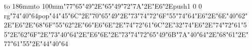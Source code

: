 \hbox to 186mm{\hsize=81mm\vbox to 100mm{\vfill\ipa\char"77\ipa\char"65\ipa\char"49\ipa\char"2E\ipa\char"65\ipa\char"49\ipa\char"72\ipa\char"7A\ipa\char"2E\ipa\char"E6\ipa\char"2E\pdfcolorstack\match push{1 0 0 rg}\ipa\char"74\ipa\char"40\ipa\char"64\pdfcolorstack\match pop{}\medskip\ipa\char"44\ipa\char"45\ipa\char"6C\ipa\char"2E\ipa\char"70\ipa\char"65\ipa\char"49\ipa\char"2E\ipa\char"73\ipa\char"74\ipa\char"72\ipa\char"6F\ipa\char"55\ipa\char"74\medskip\ipa\char"64\ipa\char"E6\ipa\char"2E\ipa\char"6E\ipa\char"40\ipa\char"62\ipa\char"2E\ipa\char"E6\ipa\char"2E\ipa\char"68\ipa\char"6F\ipa\char"55\ipa\char"62\ipa\char"2E\ipa\char"66\ipa\char"E6\ipa\char"6E\ipa\char"2E\ipa\char"74\ipa\char"72\ipa\char"61\ipa\char"6C\ipa\char"2E\ipa\char"32\ipa\char"74\medskip\ipa\char"E6\ipa\char"2E\ipa\char"74\ipa\char"72\ipa\char"61\ipa\char"55\ipa\char"2E\ipa\char"62\ipa\char"6F\ipa\char"2E\ipa\char"73\ipa\char"40\ipa\char"64\ipa\char"2E\ipa\char"E6\ipa\char"6E\ipa\char"2E\ipa\char"73\ipa\char"74\ipa\char"72\ipa\char"65\ipa\char"49\ipa\char"6B\medskip\ipa\char"7A\ipa\char"40\ipa\char"64\ipa\char"2E\ipa\char"68\ipa\char"61\ipa\char"2E\ipa\char"77\ipa\char"61\ipa\char"55\ipa\char"2E\ipa\char"44\ipa\char"40\ipa\char"64\vfill}\hfill}\eject
\bye